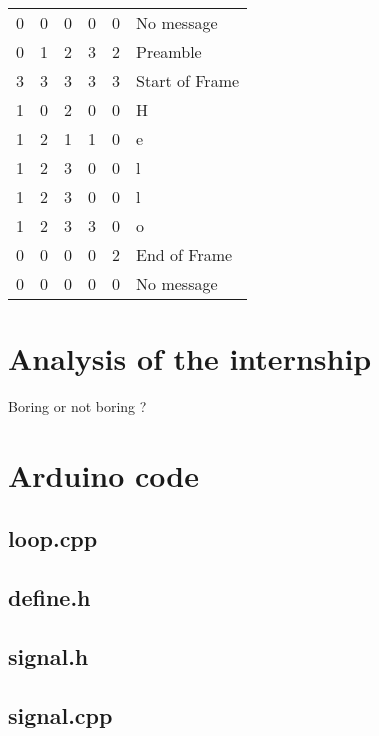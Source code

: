 \documentclass[12pt]{report}
\begin{document}
\begin{tabular}{ccccc|l}
0&0&0&0&0&No message\\
0&1&2&3&2&Preamble\\
3&3&3&3&3&Start of Frame\\
1&0&2&0&0&H\\
1&2&1&1&0&e\\
1&2&3&0&0&l\\
1&2&3&0&0&l\\
1&2&3&3&0&o\\
0&0&0&0&2&End of Frame\\
0&0&0&0&0&No message\\
\end{tabular}






\chapter{Analysis of the internship}

Boring or not boring ?












\appendix

\chapter{Arduino code}

\section{loop.cpp}



\section{define.h}



\section{signal.h}



\section{signal.cpp}
\end{document}
